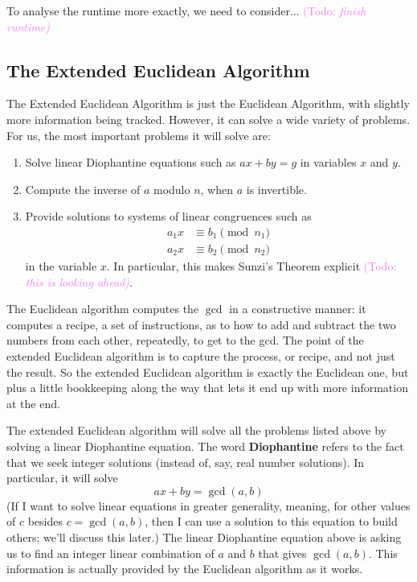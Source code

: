 \documentclass{article}
\theoremstyle{plain}
\theoremstyle{definition}
\theoremstyle{remark}
\numberwithin{theorem}{section}
\newcommand{\KS}[1]{\textcolor{violet}{{\sf (Todo:} {\sl{#1})}}}
\newcommand{\KS}[1]{}
\begin{document}
To analyse the runtime more exactly, we need to consider... \KS{finish runtime}

\subsection{The Extended Euclidean Algorithm}

The Extended Euclidean Algorithm is just the Euclidean Algorithm, with slightly more information being tracked.  However, it can solve a wide variety of problems.  For us, the most important problems it will solve are:
\begin{enumerate}
	\item Solve linear Diophantine equations such as $ax + by = g$ in variables $x$ and $y$.
	\item Compute the inverse of $a$ modulo $n$, when $a$ is invertible.
	\item Provide solutions to systems of linear congruences such as
		\begin{align*}
			a_1x &\equiv b_1 \pmod{n_1} \\
		a_2x &\equiv b_2 \pmod{n_2}
		\end{align*}
		in the variable $x$.  In particular, this makes Sunzi's Theorem explicit \KS{this is looking ahead}.
\end{enumerate}

The Euclidean algorithm computes the $\gcd$ in a constructive manner:  it computes a recipe, a set of instructions, as to how to add and subtract the two numbers from each other, repeatedly, to get to the gcd.  The point of the extended Euclidean algorithm is to capture the process, or recipe, and not just the result.  So the extended Euclidean algorithm is exactly the Euclidean one, but plus a little bookkeeping along the way that lets it end up with more information at the end.

The extended Euclidean algorithm will solve all the problems listed above by solving a linear Diophantine equation.  The word \textbf{Diophantine} refers to the fact that we seek integer solutions (instead of, say, real number solutions).  In particular, it will solve
\[
ax + by = \gcd(a,b)
\]
(If I want to solve linear equations in greater generality, meaning, for other values of $c$ besides $c=\gcd(a,b)$, then I can use a solution to this equation to build others; we'll discuss this later.)
The linear Diophantine equation above is asking us to find an integer linear combination of $a$ and $b$ that gives $\gcd(a,b)$.  This information is actually provided by the Euclidean algorithm as it works.
\end{document}
